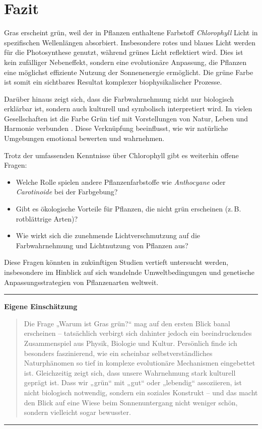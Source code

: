 \chapter{Fazit}

Gras erscheint grün, weil der in Pflanzen enthaltene Farbstoff \textit{Chlorophyll} Licht in spezifischen Wellenlängen absorbiert. Insbesondere rotes und blaues Licht werden für die Photosynthese genutzt, während grünes Licht reflektiert wird. Dies ist kein zufälliger Nebeneffekt, sondern eine evolutionäre Anpassung, die Pflanzen eine möglichst effiziente Nutzung der Sonnenenergie ermöglicht. Die grüne Farbe ist somit ein sichtbares Resultat komplexer biophysikalischer Prozesse.

Darüber hinaus zeigt sich, dass die Farbwahrnehmung nicht nur biologisch erklärbar ist, sondern auch kulturell und symbolisch interpretiert wird. In vielen Gesellschaften ist die Farbe Grün tief mit Vorstellungen von Natur, Leben und Harmonie verbunden \parencite{weber2016farbpsychologie}. Diese Verknüpfung beeinflusst, wie wir natürliche Umgebungen emotional bewerten und wahrnehmen.

Trotz der umfassenden Kenntnisse über Chlorophyll gibt es weiterhin offene Fragen:

\begin{itemize}
    \item Welche Rolle spielen andere Pflanzenfarbstoffe wie \textit{Anthocyane} oder \textit{Carotinoide} bei der Farbgebung?
    \item Gibt es ökologische Vorteile für Pflanzen, die nicht grün erscheinen (z.\,B. rotblättrige Arten)?
    \item Wie wirkt sich die zunehmende Lichtverschmutzung auf die Farbwahrnehmung und Lichtnutzung von Pflanzen aus?
\end{itemize}

Diese Fragen könnten in zukünftigen Studien vertieft untersucht werden, insbesondere im Hinblick auf sich wandelnde Umweltbedingungen und genetische Anpassungsstrategien von Pflanzenarten weltweit.

\vspace{1cm}
\hrule
\vspace{0.5cm}

\noindent\textbf{Eigene Einschätzung}

\begin{quote}
Die Frage „Warum ist Gras grün?“ mag auf den ersten Blick banal erscheinen – tatsächlich verbirgt sich dahinter jedoch ein beeindruckendes Zusammenspiel aus Physik, Biologie und Kultur. Persönlich finde ich besonders faszinierend, wie ein scheinbar selbstverständliches Naturphänomen so tief in komplexe evolutionäre Mechanismen eingebettet ist. Gleichzeitig zeigt sich, dass unsere Wahrnehmung stark kulturell geprägt ist. Dass wir „grün“ mit „gut“ oder „lebendig“ assoziieren, ist nicht biologisch notwendig, sondern ein soziales Konstrukt – und das macht den Blick auf eine Wiese beim Sonnenuntergang nicht weniger schön, sondern vielleicht sogar bewusster.
\end{quote}

\vspace{0.5cm}
\hrule
